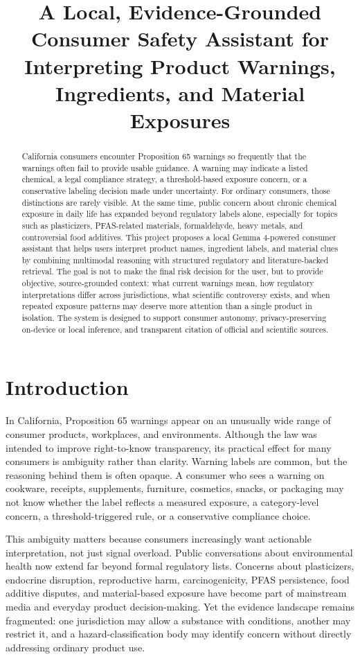 \documentclass[11pt]{article}
\title{A Local, Evidence-Grounded Consumer Safety Assistant for Interpreting Product Warnings, Ingredients, and Material Exposures}
\author{}
\date{}
\begin{document}
\maketitle

\begin{abstract}
California consumers encounter Proposition 65 warnings so frequently that the warnings often fail to provide usable guidance. A warning may indicate a listed chemical, a legal compliance strategy, a threshold-based exposure concern, or a conservative labeling decision made under uncertainty. For ordinary consumers, those distinctions are rarely visible. At the same time, public concern about chronic chemical exposure in daily life has expanded beyond regulatory labels alone, especially for topics such as plasticizers, PFAS-related materials, formaldehyde, heavy metals, and controversial food additives. This project proposes a local Gemma 4-powered consumer assistant that helps users interpret product names, ingredient labels, and material clues by combining multimodal reasoning with structured regulatory and literature-backed retrieval. The goal is not to make the final risk decision for the user, but to provide objective, source-grounded context: what current warnings mean, how regulatory interpretations differ across jurisdictions, what scientific controversy exists, and when repeated exposure patterns may deserve more attention than a single product in isolation. The system is designed to support consumer autonomy, privacy-preserving on-device or local inference, and transparent citation of official and scientific sources.
\end{abstract}

\section{Introduction}

In California, Proposition 65 warnings appear on an unusually wide range of consumer products, workplaces, and environments. Although the law was intended to improve right-to-know transparency, its practical effect for many consumers is ambiguity rather than clarity. Warning labels are common, but the reasoning behind them is often opaque. A consumer who sees a warning on cookware, receipts, supplements, furniture, cosmetics, snacks, or packaging may not know whether the label reflects a measured exposure, a category-level concern, a threshold-triggered rule, or a conservative compliance choice.

This ambiguity matters because consumers increasingly want actionable interpretation, not just signal overload. Public conversations about environmental health now extend far beyond formal regulatory lists. Concerns about plasticizers, endocrine disruption, reproductive harm, carcinogenicity, PFAS persistence, food additive disputes, and material-based exposure have become part of mainstream media and everyday product decision-making. Yet the evidence landscape remains fragmented: one jurisdiction may allow a substance with conditions, another may restrict it, and a hazard-classification body may identify concern without directly addressing ordinary product use.
\end{document}
